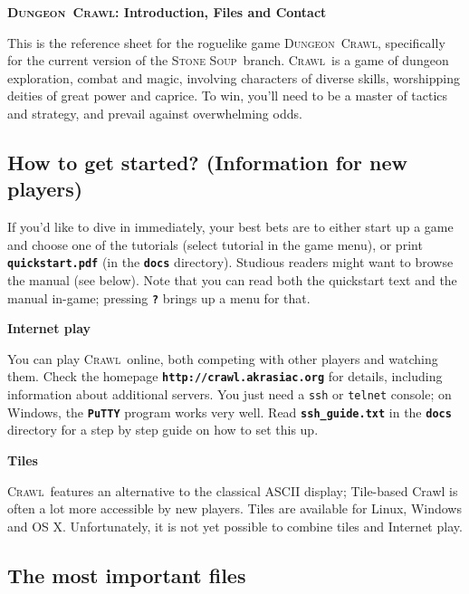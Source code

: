 \documentclass[a4paper,10pt]{article}
\newcommand{\key}[1]{{{\texttt{\textbf{#1}}}}} %
\newcommand{\sex}[1]{{{\textbf{#1}}}} %
\newcommand{\slsl}{/\hspace{-0.2em}/} %
\newcommand{\crawl}{\textsc{Crawl}}
\newcommand{\dungeon}{\textsc{Dungeon}}
\newcommand{\soup}{\textsc{Stone Soup}}
\newcommand{\para}{\vspace{1.5ex}}
\begin{document}
\begin{center}\textbf{\LARGE
\dungeon\ \crawl: Introduction, Files  and Contact
}\end{center}

This is the reference sheet for the roguelike game \dungeon\ \crawl,
specifically for the current version of the \soup\ branch. 
\crawl\ is a game of dungeon exploration, combat and magic, involving
characters of diverse skills, worshipping deities of great power and
caprice. To win, you'll need to be a master of tactics and strategy,
and prevail against overwhelming odds.

%

\subsection*{How to get started? (Information for new players)}

If you'd like to dive in immediately, your best bets are to either
start up a game and choose one of the tutorials (select tutorial in the game
menu), or print \key{quickstart.pdf} (in the \key{docs} directory). Studious
readers might want to browse the manual (see below). Note that you can read
both the quickstart text and the manual in-game; pressing \key{?} brings up a
menu for that.

\para

\sex{Internet play}

You can play \crawl\ online, both competing with other players and watching 
them. Check the homepage \key{http:\slsl crawl.akrasiac.org} for details, 
including information about additional servers. You just need a \texttt{ssh}
or \texttt{telnet} console; on Windows, the \key{PuTTY} program works very 
well. Read \key{ssh\_guide.txt} in the \key{docs} directory for a step by step 
guide on how to set this up.

\para 

\sex{Tiles}

\crawl\ features an alternative to the classical ASCII display; Tile-based
Crawl is often a lot more accessible by new players. Tiles are available for 
Linux, Windows and OS X.
Unfortunately, it is not yet possible to combine tiles and Internet play.

\subsection*{The most important files}
\end{document}
